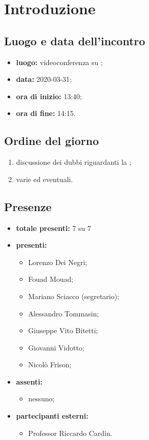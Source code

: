 \section*{Introduzione}

\subsection*{Luogo e data dell'incontro}
	\begin{itemize}
		\item \textbf{luogo:} videoconferenza su ;
		\item \textbf{data:} 2020-03-31;
		\item \textbf{ora di inizio:} 13:40;
		\item \textbf{ora di fine:} 14:15.
	\end{itemize}

\subsection*{Ordine del giorno}
	\begin{enumerate}
			\item discussione dei dubbi riguardanti la ;
  			\item varie ed eventuali.
	\end{enumerate}

\subsection*{Presenze}
	\begin{itemize}
		\item \textbf{totale presenti:} 7 su 7
		\item \textbf{presenti: }
			\begin{itemize}
				\item Lorenzo Dei Negri;
				\item Fouad Mouad;
				\item Mariano Sciacco (segretario);
				\item Alessandro Tommasin;
				\item Giuseppe Vito Bitetti;
				\item Giovanni Vidotto;
				\item Nicolò Frison;
			\end{itemize}
		\item \textbf{assenti: }
			\begin{itemize}
				\item nessuno;
			\end{itemize}
		\item  \textbf{partecipanti esterni:}
			\begin{itemize}
				\item Professor Riccardo Cardin.
			\end{itemize}
	\end{itemize}


